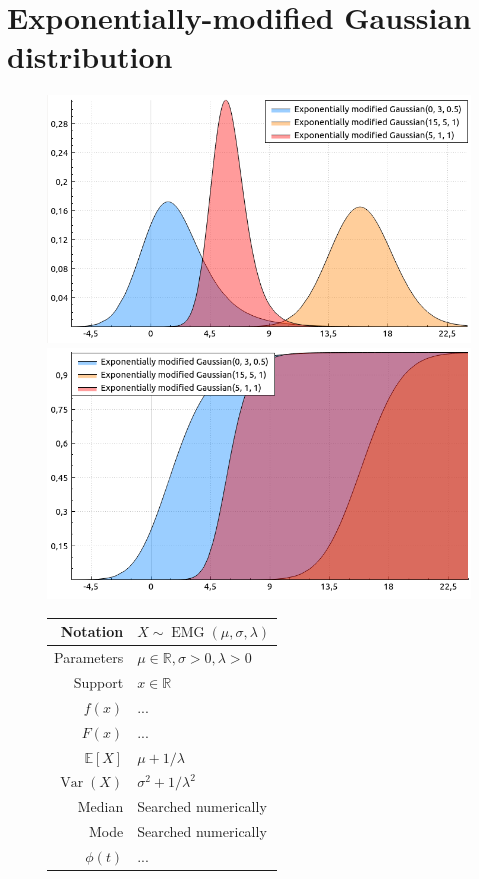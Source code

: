 \documentclass[a4paper,11pt]{article}
\theoremstyle{plain}
\theoremstyle{definition}
\newcommand{\ME}{\mathbb{E}}
\newcommand{\MR}{\mathbb{R}}
\newcommand{\Var}{\operatorname{Var}}
\begin{document}
	\section{Exponentially-modified Gaussian distribution}
	\begin{figure}[!htb]\centering
		\begin{minipage}{0.55\textwidth}
			\includegraphics[width=\linewidth, right]{emg_pdf}
			\captionsetup{labelformat=empty}
			\includegraphics[width=\linewidth, right]{emg_cdf}
			\captionsetup{labelformat=empty}
		\end{minipage}
		\begin{minipage}{0.4\textwidth}
		\begin{tabular}{| r | l |}
			\hline
			Notation & $X \sim \operatorname{EMG}(\mu, \sigma, \lambda)$ \\
			\hline
			Parameters & $\mu \in \MR, \sigma > 0, \lambda > 0$ \\
			\hline
			Support & $x \in \MR$  \\
			\hline
			$f(x)$ & $...  $ \\
			\hline
			$F(x)$ & $... $\\
			\hline
			$\ME[X]$ & $ \mu + 1 / \lambda$ \\
			\hline
			$\Var(X)$ & $\sigma^2 + 1/\lambda^2$ \\
			\hline
			Median & Searched numerically \\
			\hline
			Mode & Searched numerically \\
			\hline
			$\phi(t)$ & $ ... $ \\
			\hline
		\end{tabular}
	\end{minipage}
\end{figure}
	
\end{document}
